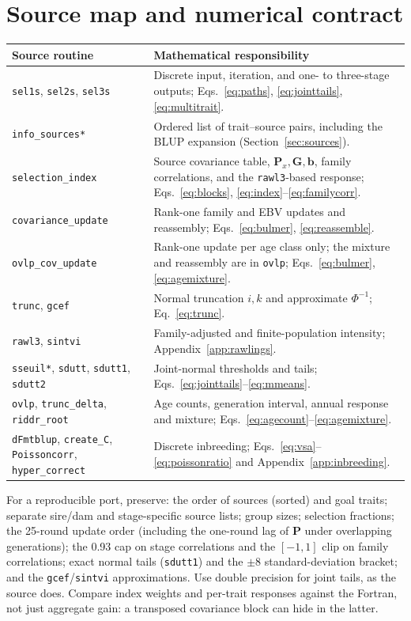 \documentclass[11pt]{article}
\newcommand{\src}[1]{\texttt{#1}}
\newcommand{\ve}[1]{\boldsymbol{#1}}
\newcommand{\ma}[1]{\mathbf{#1}}
\begin{document}
\section{Source map and numerical contract}\label{sec:sourcemap}
\begin{longtable}{>{\raggedright}p{.30\linewidth}>{\raggedright\arraybackslash}p{.63\linewidth}}
\toprule Source routine & Mathematical responsibility\\\midrule\endhead
\src{sel1s}, \src{sel2s}, \src{sel3s} & Discrete input, iteration, and one- to three-stage outputs; Eqs.~\eqref{eq:paths}, \eqref{eq:jointtails}, \eqref{eq:multitrait}.\\
\src{info\_sources*} & Ordered list of trait--source pairs, including the BLUP expansion (Section~\ref{sec:sources}).\\
\src{selection\_index} & Source covariance table, $\ma P_x,\ma G,\ve b$, family correlations, and the \src{rawl3}-based response; Eqs.~\eqref{eq:blocks}, \eqref{eq:index}--\eqref{eq:familycorr}.\\
\src{covariance\_update} & Rank-one family and EBV updates and reassembly; Eqs.~\eqref{eq:bulmer}, \eqref{eq:reassemble}.\\
\src{ovlp\_cov\_update} & Rank-one update per age class only; the mixture and reassembly are in \src{ovlp}; Eqs.~\eqref{eq:bulmer}, \eqref{eq:agemixture}.\\
\src{trunc}, \src{gcef} & Normal truncation $i,k$ and approximate $\Phi^{-1}$; Eq.~\eqref{eq:trunc}.\\
\src{rawl3}, \src{sintvi} & Family-adjusted and finite-population intensity; Appendix~\ref{app:rawlings}.\\
\src{sseuil*}, \src{sdutt}, \src{sdutt1}, \src{sdutt2} & Joint-normal thresholds and tails; Eqs.~\eqref{eq:jointtails}--\eqref{eq:mmeans}.\\
\src{ovlp}, \src{trunc\_delta}, \src{riddr\_root} & Age counts, generation interval, annual response and mixture; Eqs.~\eqref{eq:agecount}--\eqref{eq:agemixture}.\\
\src{dFmtblup}, \src{create\_C}, \src{Poissoncorr}, \src{hyper\_correct} & Discrete inbreeding; Eqs.~\eqref{eq:vsa}--\eqref{eq:poissonratio} and Appendix~\ref{app:inbreeding}.\\\bottomrule
\end{longtable}
For a reproducible port, preserve: the order of sources (sorted) and goal traits; separate sire/dam and stage-specific source lists; group sizes; selection fractions; the 25-round update order (including the one-round lag of $\ma P$ under overlapping generations); the 0.93 cap on stage correlations and the $[-1,1]$ clip on family correlations; exact normal tails (\src{sdutt1}) and the $\pm8$ standard-deviation bracket; and the \src{gcef}/\src{sintvi} approximations. Use double precision for joint tails, as the source does. Compare index weights and per-trait responses against the Fortran, not just aggregate gain: a transposed covariance block can hide in the latter.
\end{document}
